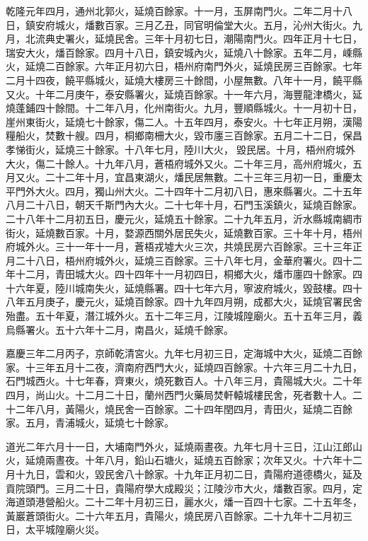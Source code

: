 \begin{pinyinscope}
乾隆元年四月，通州北郭火，延燒百餘家。十一月，玉屏南門火。二年二月十八日，鎮安府城火，燔數百家。三月乙丑，同官明倫堂大火。五月，沁州大街火。九月，北流典史署火，延燒民舍。三年十月初七日，潮陽南門火。四年正月十七日，瑞安大火，燔百餘家。四月十八日，鎮安城內火，延燒八十餘家。五年二月，嵊縣火，延燒二百餘家。六年正月初六日，梧州府南門外火，延燒民房三百餘家。七年二月十四夜，饒平縣城火，延燒大樓房三十餘間，小屋無數。八年十一月，饒平縣又火。十年二月庚午，泰安縣署火，延燒百餘家。十一年六月，海豐龍津橋火，延燒蓬鋪四十餘間。十二年八月，化州南街火。九月，豐順縣城火。十一月初十日，崖州東街火，延燒七十餘家，傷二人。十五年四月，泰安火。十七年正月朔，漢陽糧船火，焚數十艘。四月，桐鄉南柵大火，毀市廛三百餘家。五月二十二日，保昌孝悌街火，延燒三十餘家。十八年七月，陸川大火，毀民居。十月，梧州府城外大火，傷二十餘人。十九年八月，蒼梧府城外又火。二十年三月，高州府城火，五月又火。二十二年十月，宜昌東湖火，燔民居無數。二十三年三月初一日，重慶太平門外大火。四月，獨山州大火。二十四年十二月初八日，惠來縣署火。二十五年八月二十八日，朝天千斯門內大火。二十七年十月，石門玉溪鎮火，延燒百餘家。二十八年十二月初五日，慶元火，延燒五十餘家。二十九年五月，沂水縣城南綢市街火，延燒數百家。十月，婺源西關外居民失火，延燒數百家。三十年十月，梧州府城外火。三十一年十一月，蒼梧戎墟大火三次，共燒民房六百餘家。三十三年正月二十八日，梧州府城外火，延燒三百餘家。三十八年七月，金華府署火。四十二年十二月，青田城大火。四十四年十一月初四日，桐鄉大火，燔市廛四十餘家。四十六年夏，陸川城南失火，延燒縣署。四十七年六月，寧波府城火，毀鼓樓。四十八年五月庚子，慶元火，延燒百餘家。四十九年四月朔，成都大火，延燒官署民舍殆盡。五十年夏，潛江城外火。五十二年三月，江陵城隍廟火。五十五年三月，義烏縣署火。五十六年十二月，南昌火，延燒千餘家。

嘉慶三年二月丙子，京師乾清宮火。九年七月初三日，定海城中大火，延燒二百餘家。十三年五月十二夜，濟南府西門大火，延燒四百餘家。十六年三月二十九日，石門城西火。十七年春，齊東火，燒死數百人。十八年三月，貴陽城大火。二十年四月，尚山火。十二月二十日，蘭州西門火藥局焚軒轅城樓民舍，死者數十人。二十二年八月，黃陽火，燒民舍一百餘家。二十四年閏四月，青田火，延燒二百餘家。五月，青浦城火，延燒七十餘家。

道光二年六月十一日，大埔南門外火，延燒兩晝夜。九年七月十三日，江山江郎山火，延燒兩晝夜。十年八月，鉛山石塘火，延燒五百餘家；次年又火。十六年十二月十九日，雲和火，毀民舍八十餘家。十九年正月初二日，貴陽府道德橋火，延及貢院頭門。三月二十日，貴陽府學大成殿災；江陵沙市大火，燔數百家。四月，定海道頭港營船火。二十二年十月初三日，麗水火，燔一百四十七家。二十五年冬，黃巖蒼頭街火。二十六年五月，貴陽火，燒民房八百餘家。二十九年十二月初三日，太平城隍廟火災。


\end{pinyinscope}
